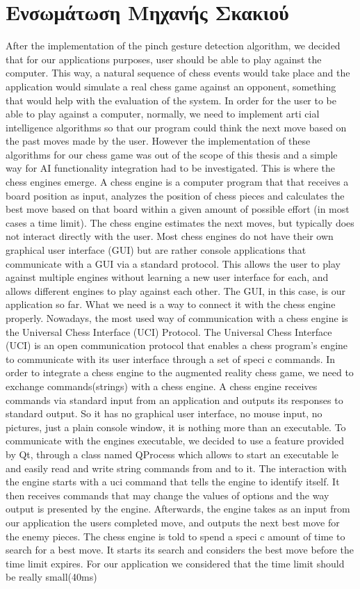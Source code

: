 \section{Ενσωμάτωση Μηχανής Σκακιού}

After the implementation of the pinch gesture detection algorithm, we decided that for our applications purposes, user should be able to play against the computer. This way, a natural sequence of chess events would take place and the application would simulate a real chess game against an opponent, something that would help with the evaluation of the system. In order for the user to be able to play against a computer, normally, we need to implement arti cial intelligence algorithms so that our program could think the next move based on the past moves made by the user. However the implementation of these algorithms for our chess game was out of the scope of this thesis and a simple way for AI functionality integration had to be investigated. This is where the chess engines emerge. A chess engine is a computer program that that receives a board position as input, analyzes the position of chess pieces and calculates the best move based on that board within a given amount of possible effort (in most cases a time limit). The chess engine estimates the next moves, but typically does not interact directly with the user. Most chess engines do not have their own graphical user interface (GUI) but are rather console applications that communicate with a GUI via a standard protocol. This allows the user to play against multiple engines without learning a new user interface for each, and allows different engines to play against each other. The GUI, in this case, is our application so far. What we need is a way to connect it with the chess engine properly. Nowadays, the most used way of communication with a chess engine is the Universal Chess Interface (UCI) Protocol. The Universal Chess Interface (UCI) is an open communication protocol that enables a chess program's engine to communicate with its user interface through a set of speci c commands. In order to integrate a chess engine to the augmented reality chess game, we need to exchange commands(strings) with a chess engine. A chess engine receives commands via standard input from an application and outputs its responses to standard output. So it has no graphical user interface, no mouse input, no pictures, just a plain console window, it is nothing more than an executable. To communicate with the engines executable, we decided to use a feature provided by Qt, through a class named QProcess which allows to start an executable le and easily read and write string commands from and to it. The interaction with the engine starts with a uci command that tells the engine to identify itself. It then receives commands that may change the values of options and the way output is presented by the engine. Afterwards, the engine takes as an input from our application the users completed move, and outputs the next best move for the enemy pieces. The chess engine is told to spend a speci c amount of time to search for a best move. It starts its search and considers the best move before the time limit expires. For our application we considered that the time limit should be really small(40ms) 